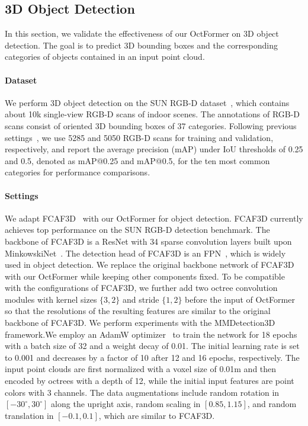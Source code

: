 \documentclass[acmtog,screen,authorversion]{acmart}
\begin{document}
\subsection{3D Object Detection}
In this section, we  validate the effectiveness of our OctFormer on 3D object detection.
The goal is to predict 3D bounding boxes and the corresponding categories of objects contained in an input point cloud. 



\paragraph{Dataset}
We perform 3D object detection on the SUN RGB-D dataset~\cite{Song2015}, which contains about 10k single-view RGB-D scans of indoor scenes.
The annotations of RGB-D scans consist of oriented 3D bounding boxes of 37 categories.
Following previous settings~\cite{Qi2019,Rukhovich2022}, we use 5285 and 5050 RGB-D scans for training and validation, respectively, and report the average precision (mAP) under IoU thresholds of 0.25 and 0.5, denoted as mAP@0.25 and mAP@0.5, for the ten most common categories for performance comparisons.


\paragraph{Settings}
We adapt FCAF3D~\cite{Rukhovich2022} with our OctFormer for object detection.
FCAF3D currently achieves top performance on the SUN RGB-D detection benchmark.
The backbone of FCAF3D is a ResNet with 34 sparse convolution layers built upon MinkowskiNet~\cite{Choy2019}.
The detection head of FCAF3D is an FPN~\cite{Lin2017}, which is widely used in object detection.
We replace the original backbone network of FCAF3D with our OctFormer while keeping other components fixed.
To be compatible with the configurations of FCAF3D, we further add two octree convolution modules with kernel sizes $\{3, 2\}$ and stride $\{1, 2\}$ before the input of OctFormer so that the resolutions of the resulting features are similar to the original backbone of FCAF3D.
We perform experiments with the MMDetection3D framework.We employ an AdamW optimizer~\cite{Loshchilov2017} to train the network for 18 epochs with a batch size of 32 and a weight decay of 0.01.
The initial learning rate is set to 0.001 and decreases by a factor of 10 after 12 and 16 epochs, respectively.
The input point clouds are first normalized with a voxel size of 0.01m and then encoded by octrees with a depth of 12, while the initial input features are point colors with 3 channels.
The data augmentations include random rotation in $[-30^\circ, 30^\circ]$ along the upright axis, random scaling in $[0.85, 1.15]$, and random translation in $[-0.1, 0.1]$, which are similar to FCAF3D.
\end{document}

